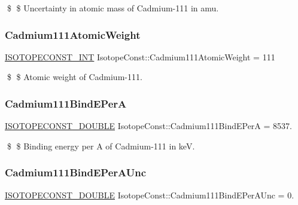 \$ \$ Uncertainty in atomic mass of Cadmium-\/111 in amu. \mbox{\label{group___isotope_const-_cadmium-_cd111_ga21c9d949040efc14325915d22523e568}} 
\subsubsection{\texorpdfstring{Cadmium111\+Atomic\+Weight}{Cadmium111AtomicWeight}}
{\footnotesize\ttfamily \mbox{\hyperlink{group___isotope_const-_macros_ga5f18360b3e99483a35c32d789e62621c}{I\+S\+O\+T\+O\+P\+E\+C\+O\+N\+S\+T\+\_\+\+I\+NT}} Isotope\+Const\+::\+Cadmium111\+Atomic\+Weight = 111}

\$ \$ Atomic weight of Cadmium-\/111. \mbox{\label{group___isotope_const-_cadmium-_cd111_ga9c41dc9bceedb2148541c40ff2462db4}} 
\subsubsection{\texorpdfstring{Cadmium111\+Bind\+E\+PerA}{Cadmium111BindEPerA}}
{\footnotesize\ttfamily \mbox{\hyperlink{group___isotope_const-_macros_ga8f45a7272ce02c0b4c65c44636ed719a}{I\+S\+O\+T\+O\+P\+E\+C\+O\+N\+S\+T\+\_\+\+D\+O\+U\+B\+LE}} Isotope\+Const\+::\+Cadmium111\+Bind\+E\+PerA = 8537.}

\$ \$ Binding energy per A of Cadmium-\/111 in keV. \mbox{\label{group___isotope_const-_cadmium-_cd111_ga84f495e0990e5142343bd4f0d413567b}} 
\subsubsection{\texorpdfstring{Cadmium111\+Bind\+E\+Per\+A\+Unc}{Cadmium111BindEPerAUnc}}
{\footnotesize\ttfamily \mbox{\hyperlink{group___isotope_const-_macros_ga8f45a7272ce02c0b4c65c44636ed719a}{I\+S\+O\+T\+O\+P\+E\+C\+O\+N\+S\+T\+\_\+\+D\+O\+U\+B\+LE}} Isotope\+Const\+::\+Cadmium111\+Bind\+E\+Per\+A\+Unc = 0.}

